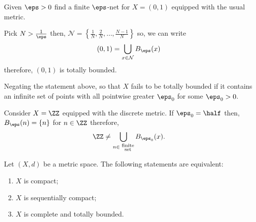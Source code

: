 \documentclass[12pt, a4paper]{article}
\begin{document}
\begin{example}
    Given \(\eps>0\) find a finite \(\eps\)-net for \(X=(0,1)\) equipped with the usual metric.
    \begin{solution}
        Pick \(N > \frac{1}{\eps}\) then, \(\mathcal{N} = \left\{ \frac{1}{N}, \frac{2}{N}, \ldots, \frac{N-1}{N} \right\}\) so, we can write 
        \[(0,1)= \bigcup_{x \in \mathcal{N}} B_{\eps}(x)\]
        therefore, \((0,1)\) is totally bounded.
    \end{solution}
\end{example}

\begin{mdexample}
    Negating the statement above, so that \(X\) fails to be totally bounded if it contains an infinite set of points with all pointwise greater \(\eps_0\) for some \(\eps_0>0\). 
    
    Consider \(X = \ZZ\) equipped with the discrete metric. If \(\eps_0 = \half\) then, \(B_{\eps}(n)=\{n\}\) for \(n \in \ZZ\) therefore,
    \[\ZZ \neq \bigcup_{n \in \substack{\text{ finite} \\ \text{ set}}} B_{\eps_0}(x).\]
\end{mdexample}

\begin{mdthm}
    Let \((X,d)\) be a metric space. The following statements are equivalent:
    \begin{enumerate}
        \item \(X\) is compact;
        \item \(X\) is sequentially compact;
        \item \(X\) is complete and totally bounded.
    \end{enumerate}
\end{mdthm}
\end{document}
